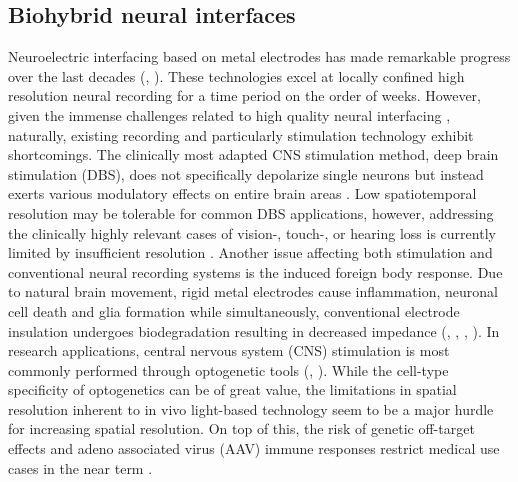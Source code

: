 \subsection{Biohybrid neural interfaces}
Neuroelectric interfacing based on metal electrodes has made remarkable progress
over the last decades (\cite{utaharray}, \cite{neuropixel}). These technologies
excel at locally confined high resolution neural recording for a time period on
the order of weeks. However, given the immense challenges related to high
quality neural interfacing \parencite{mooreslaw}, naturally, existing recording
and particularly stimulation technology exhibit shortcomings.
The clinically most adapted CNS stimulation method, deep brain stimulation
(DBS), does not specifically depolarize single neurons but instead exerts
various modulatory effects on entire brain areas \parencite{dbs}. Low
spatiotemporal resolution may be tolerable for common DBS applications, however,
addressing the clinically highly relevant cases of vision-, touch-, or hearing
loss is currently limited by insufficient resolution
\parencite{retinastimulation}. Another issue affecting both stimulation and
conventional neural recording systems is the induced foreign body response. Due
to natural brain movement, rigid metal electrodes cause inflammation, neuronal
cell death and glia formation while simultaneously, conventional electrode
insulation undergoes biodegradation resulting in decreased impedance
(\cite{eletrodeproblems1}, \cite{eletrodeproblems2}, \cite{eletrodeproblems3},
\cite{eletrodeproblems4}). In research applications, central nervous system
(CNS) stimulation is most commonly performed through optogenetic tools
(\cite{optog1}, \cite{optog2}). While the cell-type specificity of optogenetics
can be of great value, the limitations in spatial resolution inherent to in vivo
light-based technology seem to be a major hurdle for increasing spatial
resolution. On top of this, the risk of genetic off-target effects and adeno
associated virus (AAV) immune responses restrict medical use cases in the near
term \parencite{optogImmunresponse}. \\

